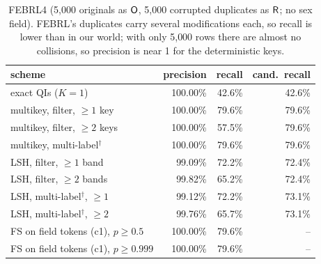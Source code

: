 \begin{table}[t]\centering\small
\caption{FEBRL4 (5{,}000 originals as $\mathsf{O}$, 5{,}000 corrupted duplicates as $\mathsf{R}$; no sex field). FEBRL's duplicates
carry several modifications each, so recall is lower than in our world; with only 5{,}000 rows there are almost no
collisions, so precision is near 1 for the deterministic keys.}\label{tab:febrl}
\begin{tabular}{@{}lrrr@{}}\toprule scheme & precision & recall & cand.\ recall\\\midrule
exact QIs ($K{=}1$) & 100.00\% & 42.6\% & 42.6\% \\
multikey, filter, $\ge1$ key & 100.00\% & 79.6\% & 79.6\% \\
multikey, filter, $\ge2$ keys & 100.00\% & 57.5\% & 79.6\% \\
multikey, multi-label$^\dagger$ & 100.00\% & 79.6\% & 79.6\% \\
LSH, filter, $\ge1$ band & 99.09\% & 72.2\% & 72.4\% \\
LSH, filter, $\ge2$ bands & 99.82\% & 65.2\% & 72.4\% \\
LSH, multi-label$^\dagger$, $\ge1$ & 99.12\% & 72.2\% & 73.1\% \\
LSH, multi-label$^\dagger$, $\ge2$ & 99.76\% & 65.7\% & 73.1\% \\
FS on field tokens (c1), $p\ge0.5$ & 100.00\% & 79.6\% & -- \\
FS on field tokens (c1), $p\ge0.999$ & 100.00\% & 79.6\% & -- \\
\bottomrule\end{tabular}\end{table}
